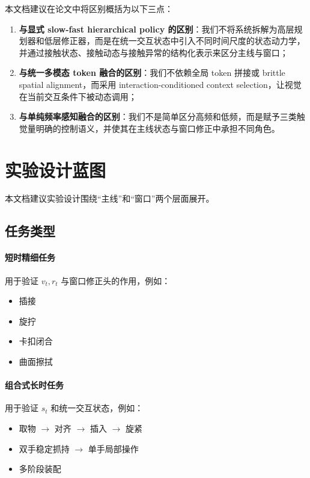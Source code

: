 \documentclass[11pt]{article}
\begin{document}
本文档建议在论文中将区别概括为以下三点：

\begin{enumerate}[leftmargin=2.2em]
    \item \textbf{与显式 slow-fast hierarchical policy 的区别}：我们不将系统拆解为高层规划器和低层修正器，而是在统一交互状态中引入不同时间尺度的状态动力学，并通过接触状态、接触动态与接触异常的结构化表示来区分主线与窗口；
    \item \textbf{与统一多模态 token 融合的区别}：我们不依赖全局 token 拼接或 brittle spatial alignment，而采用 interaction-conditioned context selection，让视觉在当前交互条件下被动态调用；
    \item \textbf{与单纯频率感知融合的区别}：我们不是简单区分高频和低频，而是赋予三类触觉量明确的控制语义，并使其在主线状态与窗口修正中承担不同角色。
\end{enumerate}

\section{实验设计蓝图}

本文档建议实验设计围绕“主线”和“窗口”两个层面展开。

\subsection{任务类型}

\paragraph{短时精细任务} 用于验证 $v_t,r_t$ 与窗口修正头的作用，例如：
\begin{itemize}[leftmargin=2em]
    \item 插接
    \item 旋拧
    \item 卡扣闭合
    \item 曲面擦拭
\end{itemize}

\paragraph{组合式长时任务} 用于验证 $s_t$ 和统一交互状态，例如：
\begin{itemize}[leftmargin=2em]
    \item 取物 $\rightarrow$ 对齐 $\rightarrow$ 插入 $\rightarrow$ 旋紧
    \item 双手稳定抓持 $\rightarrow$ 单手局部操作
    \item 多阶段装配
\end{itemize}
\end{document}
